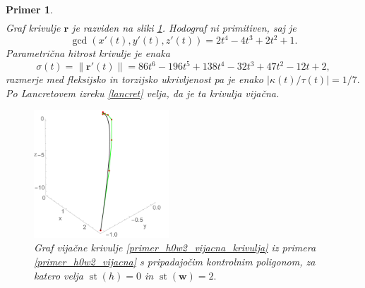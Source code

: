 \documentclass[12pt,a4paper,twoside]{article}
\theoremstyle{definition} %
\theoremstyle{plain} %
\theoremstyle{primerstyle}
\newtheorem{primer}[definicija]{Primer}
\numberwithin{equation}{section}  %
\newcommand{\rV}{\mathbf{r}}
\newcommand{\wV}{\mathbf{w}}
\DeclareMathOperator{\st}{st}
\begin{document}
\begin{primer}
\begin{align}
	\end{align}
	Graf krivulje $\rV$ je razviden na sliki \ref{fig:h0w2_vijacna}. Hodograf ni primitiven, saj je $$\gcd(x'(t),y'(t),z'(t))=2t^4-4t^3+2t^2+1.$$ Parametrična hitrost krivulje je enaka
	\begin{equation*}
		\sigma(t)=\lVert\rV'(t)\rVert=86t^6-196t^5+138t^4-32t^3+47t^2-12t+2,
	\end{equation*}
	razmerje med fleksijsko in torzijsko ukrivljenost pa je enako $|\kappa(t)/\tau(t)|=1/7.$ Po Lancretovem izreku \ref{lancret} velja, da je ta krivulja vijačna.
	\begin{figure}[h]
	  \centering
	  \includegraphics[width=0.45\textwidth]{images/h0w2_vijacna.pdf}
	  \caption[Primer vijačne krivulje ($\st(h)=0,$ $\st(\wV)=2$)]{Graf vijačne krivulje \eqref{primer_h0w2_vijacna_krivulja} iz primera \ref{primer_h0w2_vijacna} s pripadajočim kontrolnim poligonom, za katero velja $\st(h)=0$ in $\st(\wV)=2.$}
	  \label{fig:h0w2_vijacna}
	\end{figure}
\end{primer}
\end{document}
